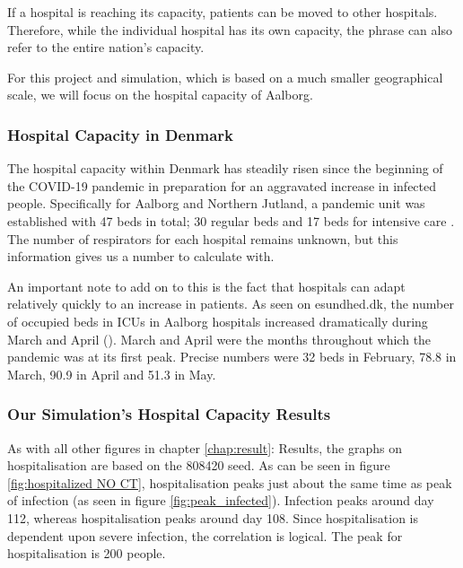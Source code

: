 If a hospital is reaching its capacity, patients can be moved to other hospitals. Therefore, while the individual hospital has its own capacity, the phrase  can also refer to the entire nation's capacity.

For this project and simulation, which is based on a much smaller geographical scale, we will focus on the hospital capacity of Aalborg.

\subsubsection{Hospital Capacity in Denmark}

The hospital capacity within Denmark has steadily risen since the beginning of the COVID-19 pandemic in preparation for an aggravated increase in infected people. Specifically for Aalborg and Northern Jutland, a pandemic unit was established with 47 beds in total; 30 regular beds and 17 beds for intensive care \citep{dansk_sygeplejerad_fra_2020}. The number of respirators for each hospital remains unknown, but this information gives us a number to calculate with.

An important note to add on to this is the fact that hospitals can adapt relatively quickly to an increase in patients. As seen on esundhed.dk, the number of occupied beds in ICUs in Aalborg hospitals increased dramatically during March and April (\cite{esundheddk_sengepladser_2020}). March and April were the months throughout which the pandemic was at its first peak. Precise numbers were 32 beds in February, 78.8 in March, 90.9 in April and 51.3 in May. 

\subsubsection{Our Simulation's Hospital Capacity Results}

As with all other figures in chapter \ref{chap:result}: Results, the graphs on hospitalisation are based on the 808420 seed. As can be seen in figure \vref{fig:hospitalized NO CT}, hospitalisation peaks just about the same time as peak of infection (as seen in figure \vref{fig:peak_infected}). Infection peaks around day 112, whereas hospitalisation peaks around day 108. Since hospitalisation is dependent upon severe infection, the correlation is logical. The peak for hospitalisation is 200 people.

